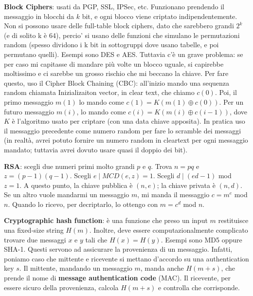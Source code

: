 \documentclass[a4paper,10pt]{article} %
\renewcommand{\b}[1]{%
    {\textbf{#1}}}
\begin{document}
\b{Block Ciphers}: usati da PGP, SSL, IPSec, etc.  Funzionano prendendo il messaggio in blocchi da $k$ bit, e ogni blocco viene criptato indipendentemente. Non si possono usare delle full-table block ciphers, dato che sarebbero grandi $2^k$ (e di solito k è 64), percio' si usano delle funzioni che simulano le permutazioni random (spesso dividono i k bit in sottogruppi dove usano tabelle, e poi permutano quelli). Esempi sono DES e AES. Tuttavia c'è un grave problema: se per caso mi capitasse di mandare più volte un blocco uguale, si capirebbe moltissimo e ci sarebbe un grosso rischio che mi beccano la chiave. Per fare questo, uso il Cipher Block Chaining (CBC): all'inizio mando una sequenza random chiamata Inizializaiton vector, in clear text, che chiamo $c(0)$. Poi, il primo messaggio $m(1)$ lo mando come $c(1) = K(m(1) \oplus c(0))$. Per un futuro messaggio $m(i)$, lo mando come $c(i) = K(m(i) \oplus c(i - 1))$, dove $K$ è l'algoritmo usato per criptare (con una data chiave apposita). In pratica uso il messaggio precedente come numero random per fare lo scramble dei messaggi (in realtà, avrei potuto fornire un numero random in cleartext per ogni messaggio mandato; tuttavia avrei dovuto usare quasi il doppio dei bit).

\b{RSA}: scegli due numeri primi molto grandi $p$ e $q$. Trova $n = pq$ e $z = (p-1)(q-1)$. Scegli $e \mid MCD(e, z) = 1$. Scegli $d \mid (ed - 1) $ mod $z = 1$. A questo punto, la chiave pubblica è $(n, e)$; la chiave privata è $(n, d)$. Se un altro vuole mandarmi un messaggio $m$, mi manda il messaggio $c = m^e$ mod $n$. Quando lo ricevo, per decriptarlo, lo ottengo con $m = c^d $ mod $n$.

\b{Cryptographic hash function}: è una funzione che preso un input $m$ restituisce una fixed-size string $H(m)$. Inoltre, deve essere computazionalmente complicato trovare due messaggi $x$ e $y$ tali che $H(x) = H(y)$. Esempi sono MD5 oppure SHA-1. Questi servono ad assicurare la provenienza di un messaggio. Infatti, poniamo caso che mittente e ricevente si mettano d'accordo su una authentication key $s$. Il mittente, mandando un messaggio $m$, manda anche $H(m + s)$, che prende il nome di \b{message authentication code} (MAC). Il ricevente, per essere sicuro della provenienza, calcola $H(m + s)$ e controlla che corrisponde. 
\end{document}
